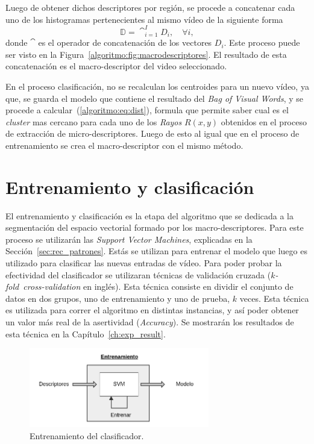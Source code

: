 	Luego de obtener dichos descriptores por región, se procede a concatenar cada uno de los histogramas pertenecientes al mismo vídeo de la siguiente forma
	\begin{equation}
		\mathds{D} = \cat_{i = 1}^{I} D_i, \quad \forall i,
	\end{equation}	   
   donde $\cat$ es el operador de concatenación de los vectores $D_i$. Este proceso puede ser visto en la Figura~\ref{algoritmo:fig:macrodescriptores}. El resultado de esta concatenación es el macro-descriptor del video seleccionado.
   


	En el proceso clasificación, no se recalculan los centroides para un nuevo vídeo, ya que, se guarda el modelo que contiene el resultado del \textit{Bag of Visual Words}, y se procede a calcular~(\ref{algoritmo:eq:dist}), formula que permite saber cual es el \textit{cluster} mas cercano para cada uno de los \textit{Rayos} $R(x,y)$ obtenidos en el proceso de extracción de micro-descriptores. Luego de esto al igual que en el proceso de entrenamiento se crea el macro-descriptor con el mismo método.
	
	
\section{Entrenamiento y clasificación}
\label{sec:clasificacion}
El entrenamiento y clasificación es la etapa del algoritmo que se dedicada a la segmentación del espacio vectorial formado por los macro-descriptores. Para este proceso se utilizarán las \textit{Support Vector Machines}, explicadas en la Sección~\ref{sec:rec_patrones}. Estás se utilizan para entrenar el modelo que luego es utilizado para clasificar las nuevas entradas de vídeo. 
Para poder probar la efectividad del clasificador se utilizaran técnicas de validación cruzada ($k$\textit{-fold~cross-validation} en inglés). Esta técnica consiste en dividir el conjunto de datos en dos grupos, uno de entrenamiento y uno de prueba, $k$ veces. Esta técnica es utilizada para correr el algoritmo en distintas instancias, y así poder obtener un valor más real de la asertividad (\textit{Accuracy}). Se mostrarán los resultados de esta técnica en la Capítulo~\ref{ch:exp_result}.

	\begin{figure}[bt]
		\centering
    		\includegraphics[width=0.7\textwidth]{Figuras/Diagramas/Entrenamiento.png}
  		\caption{Entrenamiento del clasificador.}
  		\label{algoritmo:fig:entrenamiento}
	\end{figure}	
	
